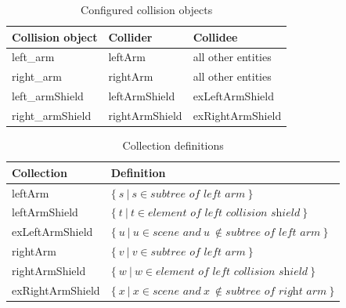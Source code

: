 \begin{table}
  \centering
  \begin{tabular}[h]{|l|l|l|} \hline
	\textbf{Collision object} & \textbf{Collider} & \textbf{Collidee} \\ \hline
	left\_arm & leftArm & all other entities \\
	right\_arm & rightArm & all other entities \\
	left\_armShield & leftArmShield & exLeftArmShield \\
	right\_armShield & rightArmShield & exRightArmShield \\ \hline
  \end{tabular}
  \caption{Configured collision objects}
  \label{fig:col_groups}
\end{table}

\begin{table}
  \centering
  \begin{tabular}[h]{|l|l|} \hline
	\textbf{Collection} & \textbf{Definition} \\ \hline
	leftArm & $\{~s~|~s\in\textit{subtree of left arm}~\}$ \\
	leftArmShield & $\{~t~|~t\in\textit{element of left collision shield}~\}$ \\
	exLeftArmShield & $\{~u~|~u\in\textit{scene and}~u~\notin\textit{subtree of left arm}~\}$ \\
	rightArm & $\{~v~|~v\in\textit{subtree of left arm}~\}$ \\
	rightArmShield & $\{~w~|~w\in\textit{element of left collision shield}~\}$ \\
	exRightArmShield & $\{~x~|~x\in\textit{scene and}~x~\notin\textit{subtree of right arm}~\}$ \\ \hline
  \end{tabular}
  \caption{Collection definitions}
  \label{fig:col_defs}
\end{table}

